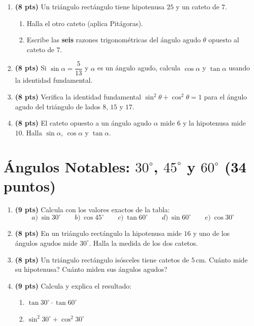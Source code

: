 \documentclass[12pt, letterpaper]{article}
\providecommand{\sen}{\sin}
\begin{document}
\begin{enumerate}[leftmargin=*]
  \item \textbf{(8 pts)} Un triángulo rectángulo tiene hipotenusa $25$ y un cateto de $7$.
        \begin{enumerate}[label=\alph*)]
          \item Halla el otro cateto (aplica Pitágoras).
          \item Escribe las \textbf{seis} razones trigonométricas del ángulo agudo $\theta$ opuesto al cateto de $7$.
        \end{enumerate}

  \item \textbf{(8 pts)} Si $\sen \alpha = \dfrac{5}{13}$ y $\alpha$ es un ángulo agudo, calcula $\cos \alpha$ y $\tan \alpha$ usando la identidad fundamental.

  \item \textbf{(8 pts)} Verifica la identidad fundamental $\sen^2 \theta + \cos^2 \theta = 1$ para el ángulo agudo del triángulo de lados $8$, $15$ y $17$.

  \item \textbf{(8 pts)} El cateto opuesto a un ángulo agudo $\alpha$ mide $6$ y la hipotenusa mide $10$. Halla $\sen \alpha$, $\cos \alpha$ y $\tan \alpha$.
\end{enumerate}

\newpage

\section{Ángulos Notables: $30^{\circ}$, $45^{\circ}$ y $60^{\circ}$ (34 puntos)}

\begin{enumerate}[leftmargin=*]
  \item \textbf{(9 pts)} Calcula con los valores exactos de la tabla:
        \[
          a)\ \sen 30^{\circ} \qquad b)\ \cos 45^{\circ} \qquad c)\ \tan 60^{\circ} \qquad d)\ \sen 60^{\circ} \qquad e)\ \cos 30^{\circ}
        \]

  \item \textbf{(8 pts)} En un triángulo rectángulo la hipotenusa mide $16$ y uno de los ángulos agudos mide $30^{\circ}$. Halla la medida de los dos catetos.

  \item \textbf{(8 pts)} Un triángulo rectángulo isósceles tiene catetos de $5$\,cm. \textquestiondown Cuánto mide su hipotenusa? \textquestiondown Cuánto miden sus ángulos agudos?

  \item \textbf{(9 pts)} Calcula y explica el resultado:
        \begin{enumerate}[label=\alph*)]
          \item $\tan 30^{\circ} \cdot \tan 60^{\circ}$
          \item $\sen^2 30^{\circ} + \cos^2 30^{\circ}$
        \end{enumerate}
\end{enumerate}
\end{document}
